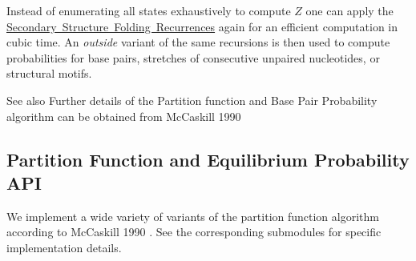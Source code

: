 Instead of enumerating all states exhaustively to compute $Z$ one can apply the \mbox{\hyperlink{folding_grammar_sec_recursions}{Secondary Structure Folding Recurrences}} again for an efficient computation in cubic time. An {\itshape outside} variant of the same recursions is then used to compute probabilities for base pairs, stretches of consecutive unpaired nucleotides, or structural motifs.

\begin{DoxySeeAlso}{See also}
Further details of the Partition function and Base Pair Probability algorithm can be obtained from Mc\+Caskill 1990 \cite{mccaskill:1990}
\end{DoxySeeAlso}
\hypertarget{pf_algorithm_sec_pf_api}{}\subsection{Partition Function and Equilibrium Probability A\+PI}\label{pf_algorithm_sec_pf_api}
We implement a wide variety of variants of the partition function algorithm according to Mc\+Caskill 1990 \cite{mccaskill:1990}. See the corresponding submodules for specific implementation details.

